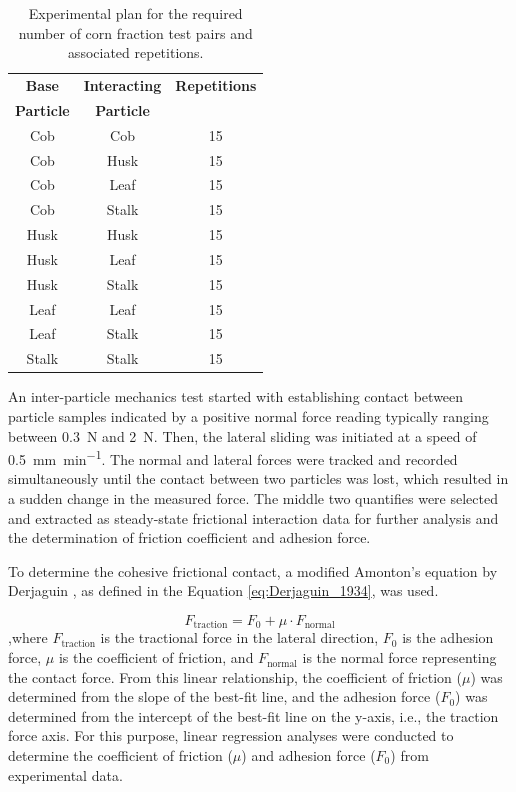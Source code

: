 \documentclass[xcolor=dvipsnames,10pt,hidelinks]{article}
\begin{document}
\begin{table}[htbp]
\caption{\label{tab:org3d9ce72}Experimental plan for the required number of corn fraction test pairs and associated repetitions.}
\centering
\begin{tabular}{ccc}
\hline
\textbf{Base} & \textbf{Interacting} & \textbf{Repetitions}\\
\textbf{Particle} & \textbf{Particle} & \\
\hline
Cob & Cob & 15\\
Cob & Husk & 15\\
Cob & Leaf & 15\\
Cob & Stalk & 15\\
Husk & Husk & 15\\
Husk & Leaf & 15\\
Husk & Stalk & 15\\
Leaf & Leaf & 15\\
Leaf & Stalk & 15\\
Stalk & Stalk & 15\\
\hline
\end{tabular}
\end{table}

An inter-particle mechanics test started with establishing contact between particle samples indicated by a positive normal force reading typically ranging between \qty{0.3}{\newton} and \qty{2}{\newton}.
Then, the lateral sliding was initiated at a speed of \qty{0.5}{\milli\meter\per\minute}.
The normal and lateral forces were tracked and recorded simultaneously until the contact between two particles was lost,
which resulted in a sudden change in the measured force.
The middle two quantifies were selected and extracted as steady-state frictional interaction data for further analysis and the determination of friction coefficient and adhesion force.

To determine the cohesive frictional contact, a modified Amonton's equation by Derjaguin \parencite{derjaguin1934molekulartheorie,gao_frictional_2004,derjaguin_effect_1975}, as defined in the Equation \eqref{eq:Derjaguin_1934}, was used.

\begin{equation}
\label{eq:Derjaguin_1934}
F_{\text{traction}} = F_{0} + \mu\cdot F_{\text{normal}}
\end{equation}
,where \(F_{\text{traction}}\) is the tractional force in the lateral direction,
\(F_0\) is the adhesion force,
\(\mu\) is the coefficient of friction, and
\(F_{\text{normal}}\)  is the normal force representing the contact force.
From this linear relationship, the coefficient of friction (\(\mu\)) was determined from the slope of the best-fit line,
and the adhesion force (\(F_0\)) was determined from the intercept of the best-fit line on the y-axis, i.e., the traction force axis.
For this purpose, linear regression analyses were conducted to determine the coefficient of friction (\(\mu\)) and adhesion force (\(F_0\)) from experimental data.
\end{document}
